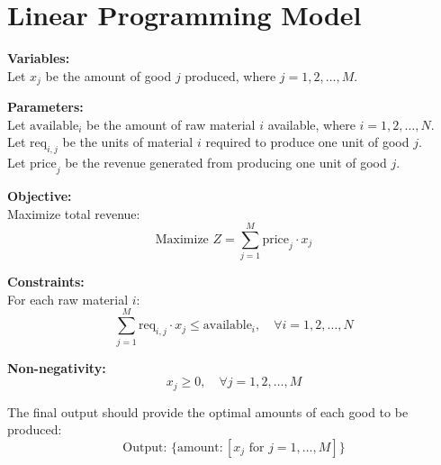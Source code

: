 \documentclass{article}
\begin{document}
\section*{Linear Programming Model}

\textbf{Variables:} \\
Let \( x_j \) be the amount of good \( j \) produced, where \( j = 1, 2, \ldots, M \).

\textbf{Parameters:} \\
Let \( \text{available}_i \) be the amount of raw material \( i \) available, where \( i = 1, 2, \ldots, N \). \\
Let \( \text{req}_{i,j} \) be the units of material \( i \) required to produce one unit of good \( j \). \\
Let \( \text{price}_j \) be the revenue generated from producing one unit of good \( j \).

\textbf{Objective:} \\
Maximize total revenue:
\[
\text{Maximize } Z = \sum_{j=1}^{M} \text{price}_j \cdot x_j
\]

\textbf{Constraints:} \\
For each raw material \( i \):
\[
\sum_{j=1}^{M} \text{req}_{i,j} \cdot x_j \leq \text{available}_i, \quad \forall i = 1, 2, \ldots, N
\]

\textbf{Non-negativity:} \\
\[
x_j \geq 0, \quad \forall j = 1, 2, \ldots, M
\]

The final output should provide the optimal amounts of each good to be produced:
\[
\text{Output: } \{ \text{amount} : [x_j \text{ for } j = 1, \ldots, M] \}
\]
\end{document}
